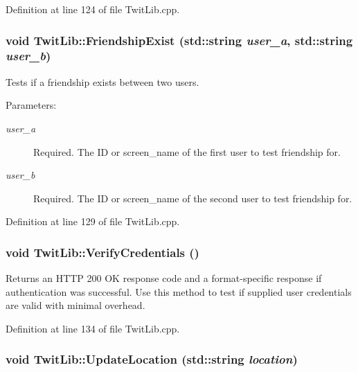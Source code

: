 Definition at line 124 of file TwitLib.cpp.\hypertarget{classTwitLib_31f1bc4db7624b5e9a6eeffc648778c5}{
\subsubsection{\setlength{\rightskip}{0pt plus 5cm}void TwitLib::FriendshipExist (std::string {\em user\_\-a}, \/  std::string {\em user\_\-b})}}
\label{classTwitLib_31f1bc4db7624b5e9a6eeffc648778c5}


Tests if a friendship exists between two users. \begin{Desc}
\item[Parameters:]
\begin{description}
\item[{\em user\_\-a}]Required. The ID or screen\_\-name of the first user to test friendship for. \item[{\em user\_\-b}]Required. The ID or screen\_\-name of the second user to test friendship for. \end{description}
\end{Desc}


Definition at line 129 of file TwitLib.cpp.\hypertarget{classTwitLib_50ebe7525d2f6acb9ecd9a9217265c79}{
\subsubsection{\setlength{\rightskip}{0pt plus 5cm}void TwitLib::VerifyCredentials ()}}
\label{classTwitLib_50ebe7525d2f6acb9ecd9a9217265c79}


Returns an HTTP 200 OK response code and a format-specific response if authentication was successful. Use this method to test if supplied user credentials are valid with minimal overhead. 

Definition at line 134 of file TwitLib.cpp.\hypertarget{classTwitLib_b133510fb4b88bd568a404e8271c7df4}{
\subsubsection{\setlength{\rightskip}{0pt plus 5cm}void TwitLib::UpdateLocation (std::string {\em location})}}
\label{classTwitLib_b133510fb4b88bd568a404e8271c7df4}



